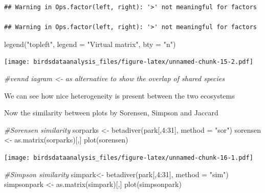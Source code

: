 \documentclass[
]{article}
\newenvironment{Shaded}{\begin{snugshade}}{\end{snugshade}}
\newcommand{\AttributeTok}[1]{\textcolor[rgb]{0.77,0.63,0.00}{#1}}
\newcommand{\CommentTok}[1]{\textcolor[rgb]{0.56,0.35,0.01}{\textit{#1}}}
\newcommand{\DecValTok}[1]{\textcolor[rgb]{0.00,0.00,0.81}{#1}}
\newcommand{\FunctionTok}[1]{\textcolor[rgb]{0.00,0.00,0.00}{#1}}
\newcommand{\NormalTok}[1]{#1}
\newcommand{\OtherTok}[1]{\textcolor[rgb]{0.56,0.35,0.01}{#1}}
\newcommand{\SpecialCharTok}[1]{\textcolor[rgb]{0.00,0.00,0.00}{#1}}
\newcommand{\StringTok}[1]{\textcolor[rgb]{0.31,0.60,0.02}{#1}}
\begin{document}
\begin{verbatim}
## Warning in Ops.factor(left, right): '>' not meaningful for factors

## Warning in Ops.factor(left, right): '>' not meaningful for factors
\end{verbatim}

\begin{Shaded}
\begin{Highlighting}[]
\FunctionTok{legend}\NormalTok{(}\StringTok{"topleft"}\NormalTok{, }\AttributeTok{legend =} \StringTok{"Virtual matrix"}\NormalTok{, }\AttributeTok{bty =} \StringTok{"n"}\NormalTok{)}
\end{Highlighting}
\end{Shaded}

\texttt{[image: birdsdataanalysis\_files/figure-latex/unnamed-chunk-15-2.pdf]}

\begin{Shaded}
\begin{Highlighting}[]
\CommentTok{\#vennd iagram \textless{}{-} as alternative to show the overlap of shared species    }
\end{Highlighting}
\end{Shaded}

We can see how nice heterogeneity is present between the two ecosystems

Now the similarity between plots by Sorensen, Simpson and Jaccard

\begin{Shaded}
\begin{Highlighting}[]
\CommentTok{\#Sorensen similarity}
\NormalTok{sorparks }\OtherTok{\textless{}{-}}  \FunctionTok{betadiver}\NormalTok{(park[,}\DecValTok{4}\SpecialCharTok{:}\DecValTok{31}\NormalTok{], }\AttributeTok{method =} \StringTok{"sor"}\NormalTok{)}
\NormalTok{sorensen }\OtherTok{\textless{}{-}}  \FunctionTok{as.matrix}\NormalTok{(sorparks)[,]}
\FunctionTok{plot}\NormalTok{(sorensen)}
\end{Highlighting}
\end{Shaded}

\texttt{[image: birdsdataanalysis\_files/figure-latex/unnamed-chunk-16-1.pdf]}

\begin{Shaded}
\begin{Highlighting}[]
\CommentTok{\#Simpson similarity}
\NormalTok{simpark}\OtherTok{\textless{}{-}} \FunctionTok{betadiver}\NormalTok{(park[,}\DecValTok{4}\SpecialCharTok{:}\DecValTok{31}\NormalTok{], }\AttributeTok{method =} \StringTok{"sim"}\NormalTok{)}
\NormalTok{simpsonpark }\OtherTok{\textless{}{-}} \FunctionTok{as.matrix}\NormalTok{(simpark)[,]}
\FunctionTok{plot}\NormalTok{(simpsonpark)}
\end{Highlighting}
\end{Shaded}
\end{document}
